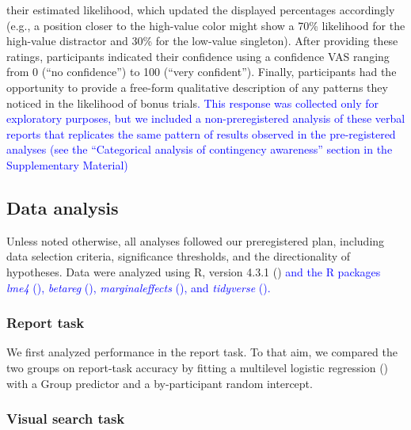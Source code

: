 \documentclass[
  man,
  floatsintext,
  longtable,
  nolmodern,
  notxfonts,
  notimes,
  mask,
  colorlinks=true,linkcolor=blue,citecolor=blue,urlcolor=blue]{apa7}
\begin{document}
their estimated likelihood, which updated the displayed percentages
accordingly (e.g., a position closer to the high-value color might show
a 70\% likelihood for the high-value distractor and 30\% for the
low-value singleton). After providing these ratings, participants
indicated their confidence using a confidence VAS ranging from 0 (``no
confidence'') to 100 (``very confident''). Finally, participants had the
opportunity to provide a free-form qualitative description of any
patterns they noticed in the likelihood of bonus
trials\textcolor{blue}{. This response was collected only for
exploratory purposes, but we included a non-preregistered analysis of
these verbal reports that replicates the same pattern of results
observed in the pre-registered analyses (see the ``Categorical analysis
of contingency awareness'' section in the Supplementary Material)}

\subsection{Data analysis}\label{data-analysis}

Unless noted otherwise, all analyses followed our preregistered plan,
including data selection criteria, significance thresholds, and the
directionality of hypotheses. Data were analyzed using R, version 4.3.1
() \textcolor{blue}{and the R
packages \emph{lme4} (), \emph{betareg} (), \emph{marginaleffects}
(),
and \emph{tidyverse} ().}

\subsubsection{Report task}\label{report-task}

We first analyzed performance in the report task. To that aim, we
compared the two groups on report-task accuracy by fitting a multilevel
logistic regression () with a
Group predictor and a by-participant random intercept.

\subsubsection{Visual search task}\label{visual-search-task}
\end{document}
